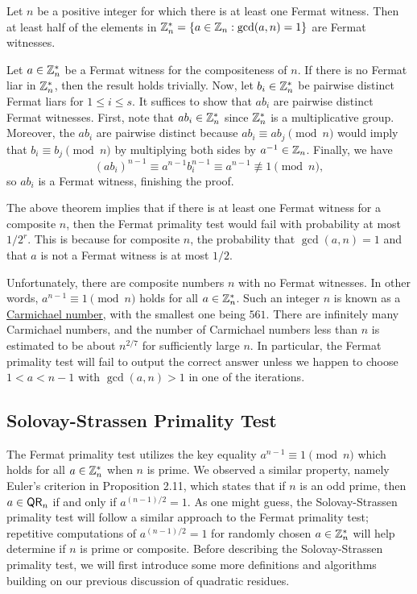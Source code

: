 \begin{thm}
Let $n$ be a positive integer for which there is at least one Fermat witness. Then at least 
half of the elements in $\mathbb{Z}_n^* = \{a \in \mathbb{Z}_n : \gcd(a, n) = 1\}$ are Fermat witnesses. 
\end{thm}
\begin{pf}
Let $a \in \mathbb{Z}_n^*$ be a Fermat witness for the compositeness of $n$. If there is no Fermat liar in 
$\mathbb{Z}_n^*$, then the result holds trivially. Now, let $b_i \in \mathbb{Z}_n^*$ be pairwise distinct 
Fermat liars for $1 \leq i \leq s$. It suffices to show that $ab_i$ are pairwise distinct 
Fermat witnesses. First, note that $ab_i \in \mathbb{Z}_n^*$ since $\mathbb{Z}_n^*$ is a multiplicative group. 
Moreover, the $ab_i$ are pairwise distinct because $ab_i \equiv ab_j \pmod n$ would imply that 
$b_i \equiv b_j \pmod n$ by multiplying both sides by $a^{-1} \in \mathbb{Z}_n$. Finally, we have 
\[ (ab_i)^{n-1} \equiv a^{n-1} b_i^{n-1} \equiv a^{n-1} \not\equiv 1 \pmod n, \]
so $ab_i$ is a Fermat witness, finishing the proof. 
\end{pf}

The above theorem implies that if there is at least one Fermat witness for a composite $n$, then 
the Fermat primality test would fail with probability at most $1/2^r$. This is because for 
composite $n$, the probability that $\gcd(a, n) = 1$ and that $a$ is not a Fermat witness is at 
most $1/2$. 

Unfortunately, there are composite numbers $n$ with no Fermat witnesses. 
In other words, $a^{n-1} \equiv 1 \pmod n$ holds for all $a \in \mathbb{Z}_n^*$. Such an integer $n$ 
is known as a \href{https://en.wikipedia.org/wiki/Carmichael_number}{Carmichael number}, with the smallest one being $561$. There are 
infinitely many Carmichael numbers, and the number of Carmichael numbers less than $n$ is 
estimated to be about $n^{2/7}$ for sufficiently large $n$. In particular, the Fermat primality 
test will fail to output the correct answer unless we happen to choose $1 < a < n-1$ with 
$\gcd(a, n) > 1$ in one of the iterations. 

\subsection{Solovay-Strassen Primality Test}
The Fermat primality test utilizes the key equality $a^{n-1} \equiv 1 \pmod n$ which holds for all $a \in 
\mathbb{Z}_n^*$ when $n$ is prime. We observed a similar property, namely Euler's criterion in Proposition 2.11,
which states that if $n$ is an odd prime, then $a \in {\sf QR}_n$ if and only if $a^{(n-1)/2} = 1$. 
As one might guess, the Solovay-Strassen primality test will follow a similar approach to the 
Fermat primality test; repetitive computations of $a^{(n-1)/2} = 1$ for randomly chosen 
$a \in \mathbb{Z}_n^*$ will help determine if $n$ is prime or composite. Before describing the 
Solovay-Strassen primality test, we will first introduce some more definitions and algorithms 
building on our previous discussion of quadratic residues. 

